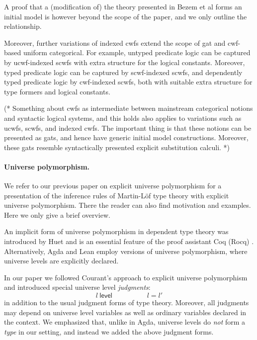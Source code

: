 \documentclass[11pt,a4paper]{article}
\theoremstyle{definition}
\newcommand{\level}{\mathsf{level}}
\begin{document}
A proof that a (modification of) the theory presented in Bezem et al forms an initial model \cite{BezemCDE22} is however beyond the scope of the paper, and we only outline the relationship. 

Moreover, further variations of indexed cwfs extend the scope of gat and cwf-based uniform categorical. For example, untyped predicate logic can be captured by ucwf-indexed scwfs with extra structure for the logical constants. Moreover, typed predicate logic can be captured by scwf-indexed scwfs, and dependently typed predicate logic by cwf-indexed scwfs, both with suitable extra structure for type formers and logical constants.

(* Something about cwfs as intermediate between mainstream categorical notions and syntactic logical systems, and this holds also applies to variations such as ucwfs, scwfs, and indexed cwfs. The important thing is that these notions can be presented as gats, and hence have generic initial model constructions. Moreover, these gats resemble syntactically presented explicit substitution calculi. *)

\paragraph{Universe polymorphism.} We refer to our previous paper on explicit universe polymorphism \cite{BezemCDE22} for a presentation of the inference rules of Martin-Löf type theory with explicit universe polymorphism. There the reader can also find motivation and examples. Here we only give a brief overview. 

An implicit form of universe polymorphism in dependent type theory was introduced by Huet \cite{Huet87} and is an essential feature of the proof assistant Coq (Rocq) \cite{coq:general}. Alternatively, Agda \cite{agda-wiki} and Lean \cite{moura:lean} employ versions of universe polymorphism, where universe levels are explicitly declared. 

In our paper we followed Courant's approach \cite{Courant02} to explicit universe polymorphism and introduced special universe level {\em judgments}:
$$
l\ \level
\hspace{5em}
l = l'
$$
in addition to the usual judgment forms of type theory. Moreover, all judgments may depend on universe level variables as well as ordinary variables declared in the context. We emphasized that, unlike in Agda, universe levels do {\em not} form a {\em type} in our setting, and instead we added the above judgment forms. 
\end{document}
